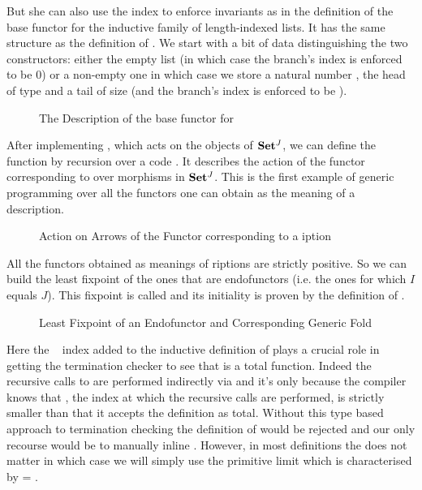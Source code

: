 But she can also use the index to enforce invariants as in the definition
of the base functor for the    inductive family of
length-indexed lists. It has the same structure as the definition of .
We start with a bit of data distinguishing the two constructors: either
the empty list (in which case the branch's index is enforced to be $0$) or a
non-empty one in which case we store a natural number , the head of type
 and a tail of size  (and the branch's index is enforced to be
 ).

\begin{figure}[h]
\caption{The Description of the base functor for   }\label{figure:vecD}
\end{figure}

After implementing , which acts on the objects of $\mathbf{Set}{}^J$, we can
define the function  by recursion over a code . It describes
the action of the functor corresponding to  over morphisms in $\mathbf{Set}{}^J$.
This is the first example of generic programming over all the functors one can
obtain as the meaning of a description.

\begin{figure}[h]
\caption{Action on Arrows of the Functor corresponding to a iption}
\end{figure}

All the functors obtained as meanings of riptions are strictly
positive. So we can build the least fixpoint of the ones that are endofunctors
(i.e. the ones for which $I$ equals $J$). This fixpoint is called 
and its initiality is proven by the definition of  .

\begin{figure}[h]
\caption{Least Fixpoint of an Endofunctor and Corresponding Generic Fold}
\end{figure}

Here the ~\cite{DBLP:journals/corr/abs-1012-4896} index added
to the inductive definition of  plays a crucial role in getting
the termination checker to see that  is a total function.
Indeed the recursive calls to  are performed indirectly via
 and it's only because the compiler knows that , the index
at which the recursive calls are performed, is strictly smaller than
  that it accepts the definition as total. Without this type
based approach to termination checking the definition of  would
be rejected and our only recourse would be to manually inline .
However, in most definitions the  does not matter in which case
we will simply use the primitive limit   which is
characterised by  =  .

